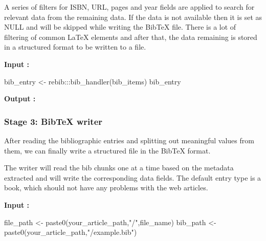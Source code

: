 A series of filters for ISBN, URL, pages and year fields are applied to search for relevant data from the remaining data. If the data is not available then it is set as NULL and will be skipped while writing the BibTeX file. 
There is a lot of filtering of common LaTeX elements and after that, the data remaining is stored in a structured format to be written to a file. 


\begin{Schunk}
 
\textbf{Input :}
\begin{Sinput}
bib_entry <- rebib:::bib_handler(bib_items)
bib_entry
\end{Sinput}
 
\textbf{Output :}
\end{Schunk}


\subsubsection{Stage 3: BibTeX writer}

After reading the bibliographic entries and splitting out meaningful values from them, we can finally write a structured file in the BibTeX format.

The writer will read the bib chunks one at a time based on the metadata extracted and will write the corresponding data fields. The default entry type is a book, which should not have any problems with the web articles. 
\begin{Schunk}
 
\textbf{Input :}
\begin{Sinput}
file_path <- paste0(your_article_path,"/",file_name)
bib_path <- paste0(your_article_path,"/example.bib")
\end{Sinput}
\end{Schunk}

